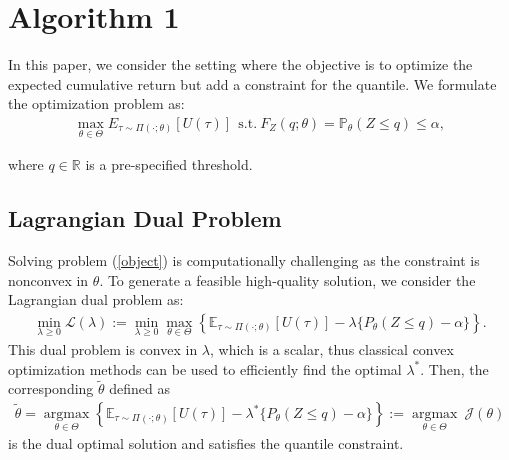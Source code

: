 
\section{Algorithm 1}
In this paper, we consider the setting where the objective is to optimize the expected cumulative return but add a constraint for the quantile. We formulate the optimization problem as:
\textbf{\textcolor{ECNURed}{
\begin{align} \label{object}
    \max_{\theta \in \Theta}E_{\tau\sim\Pi(\cdot;\theta)}[U(\tau)] ~~\text{s.t.}~F_Z(q;\theta)=\mathbb P_\theta(Z\le q)\le \alpha ,
\end{align}
}}

where $q \in \mathbb{R}$ is a pre-specified threshold.

\subsection{Lagrangian Dual Problem}
Solving problem (\ref{object}) is computationally challenging as the constraint is nonconvex in $\theta$. To generate a feasible high-quality solution, we consider the Lagrangian dual problem as:
\textbf{\textcolor{ECNURed}{
\begin{align} \label{dual-lag}
    \min_{\lambda\geq0}\mathcal{L}(\lambda):= \min_{\lambda\geq0}\max_{\theta\in\Theta}\left\{\mathbb{E}_{\tau\sim\Pi(\cdot;\theta)}[U(\tau)]-\lambda\{P_\theta(Z\le q) - \alpha\}\right\}.
\end{align}
}}
This dual problem is convex in $\lambda$, which is a scalar, thus classical convex optimization methods can be used to efficiently find the optimal $\lambda^*$. Then, the corresponding $\tilde{\theta}$ defined as
\textbf{\textcolor{ECNURed}{
\begin{align} \label{eq:lag-dual}
    \tilde{\theta}=\mathop{\arg\max}\limits_{\theta\in\Theta} \left\{\mathbb{E}_{\tau\sim\Pi(\cdot;\theta)}[U(\tau)]-\lambda^*\{P_\theta(Z\le q) - \alpha\}\right\} := \mathop{\arg\max}\limits_{\theta\in\Theta}~\mathcal{J}(\theta)
\end{align}
}}
is the dual optimal solution and satisfies the quantile constraint.

